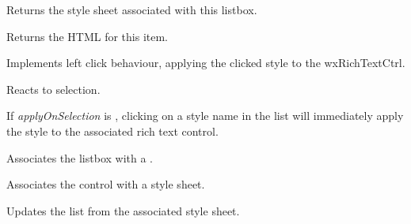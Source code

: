
Returns the style sheet associated with this listbox.

\label{wxrichtextstylelistboxongetitem}


Returns the HTML for this item.

\label{wxrichtextstylelistboxonleftdown}


Implements left click behaviour, applying the clicked style to the wxRichTextCtrl.

\label{wxrichtextstylelistboxonselect}


Reacts to selection.

\label{wxrichtextstylelistboxsetapplyonselection}


If {\it applyOnSelection} is \true, clicking on a style name in the list will immediately
apply the style to the associated rich text control.

\label{wxrichtextstylelistboxsetrichtextctrl}


Associates the listbox with a .

\label{wxrichtextstylelistboxsetstylesheet}


Associates the control with a style sheet.

\label{wxrichtextstylelistboxupdatestyles}


Updates the list from the associated style sheet.

